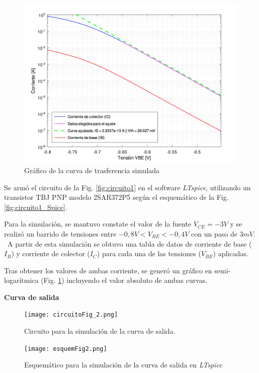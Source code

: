 \documentclass[10pt]{article}
\begin{document}
\setlength{\columnsep}{0.4cm} 
\begin{multicols}{2}
    
    \begin{figure}[H]
        \centering
        \includegraphics[width=0.95\linewidth]{curvaT.png}
        \caption{Gráfico de la curva de trasferencia simulada}
        \label{fig:curvaTransferencia}
        \end{figure}

    \columnbreak
    
    \noindent
    Se armó el circuito de la Fig. \ref{fig:circuito1} en el software \textit{LTspice}, utilizando un transistor TBJ PNP modelo 2SAR372P5 según el esquemático de la Fig. \ref{fig:circuito1_Spice}. 

    Para la simulación, se mantuvo constate el valor de la fuente $V_{CE} = -3V$ y se realizó un barrido de tensiones entre $-0,8V < V_{BE} < -0,4V$ con un paso de $3mV$. 
    \, A partir de esta simulación se obtuvo una tabla de datos de corriente de base ($I_B$) y corriente de colector ($I_C$) para cada una de las tensiones ($V_{BE}$) aplicadas.

    Tras obtener los valores de ambas corriente, se generó un gráfico en semi-logarítmica (Fig. \ref{fig:curvaTransferencia}) incluyendo el valor absoluto de ambas curvas. 
\end{multicols}

\textbf{Curva de salida}
\setlength{\columnsep}{2cm} %
\begin{multicols}{2}
    \noindent    
    \begin{figure}[H]
        \centering
        \texttt{[image: circuitoFig\_2.png]}
        \caption{Circuito para la simulación de la curva de salida.}
        \label{fig:circuito2}
    \end{figure}

    \columnbreak
    
    \begin{figure}[H]
        \centering
        \texttt{[image: esquemFig2.png]}
        \caption{Esquemático para la simulación de la curva de salida en \textit{LTspice}}
        \label{fig:circuito2_Spice}
    \end{figure}
\end{multicols}
\end{document}
